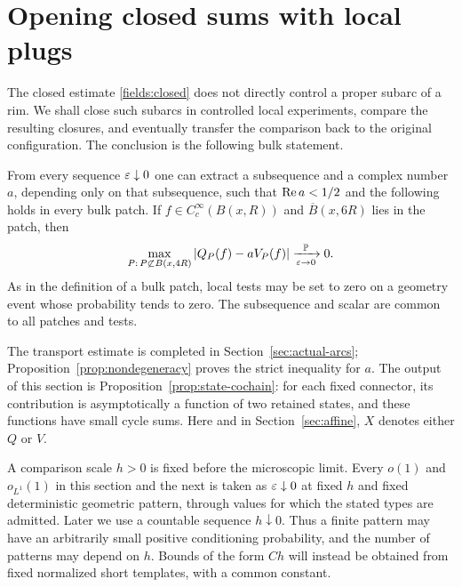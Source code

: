 \section{Opening closed sums with local plugs}\label{sec:plugs}

The closed estimate \eqref{fields:closed} does not directly control a
proper subarc of a rim.  We shall close such subarcs in controlled local
experiments, compare the resulting closures, and eventually transfer the
comparison back to the original configuration.  The conclusion is the
following bulk statement.

\begin{theorem}\label{thm:bulk-transport}
From every sequence $\varepsilon\downarrow0$ one can extract a subsequence and a
complex number $a$, depending only on that subsequence, such that
$\operatorname{Re} a<1/2$ and the following holds in every bulk patch.  If
$f\in C_c^\infty(B(x,R))$ and $\overline B(x,6R)$ lies in the patch, then
\begin{equation}\label{transport:bulk}
 \max_{P:\,P\not\subset B(x,4R)}
       |Q_P(f)-aV_P(f)|\xrightarrow[\varepsilon\to0]{\mathbb P}0.
\end{equation}
As in the definition of a bulk patch, local tests may be set to zero on a
geometry event whose probability tends to zero.  The subsequence and
scalar are common to all patches and tests.
\end{theorem}

The transport estimate is completed in Section~\ref{sec:actual-arcs};
Proposition~\ref{prop:nondegeneracy} proves the strict inequality for $a$.
The output of this section is Proposition~\ref{prop:state-cochain}:
for each fixed connector, its contribution is asymptotically a function
of two retained states, and these functions have small cycle sums.
Here and in Section~\ref{sec:affine}, $X$ denotes either $Q$ or $V$.

\begin{convention}\label{plug:scale-order}
A comparison scale $h>0$ is fixed before the microscopic limit.  Every
$o(1)$ and $o_{L^1}(1)$ in this section and the next is taken as
$\varepsilon\downarrow0$ at fixed $h$ and fixed deterministic geometric pattern,
through values for which the stated types are admitted.  Later we use a
countable sequence $h\downarrow0$.  Thus a finite pattern may have an
arbitrarily small positive conditioning probability, and the number of
patterns may depend on $h$.  Bounds of the form $C h$ will instead be
obtained from fixed normalized short templates, with a common constant.
\end{convention}

